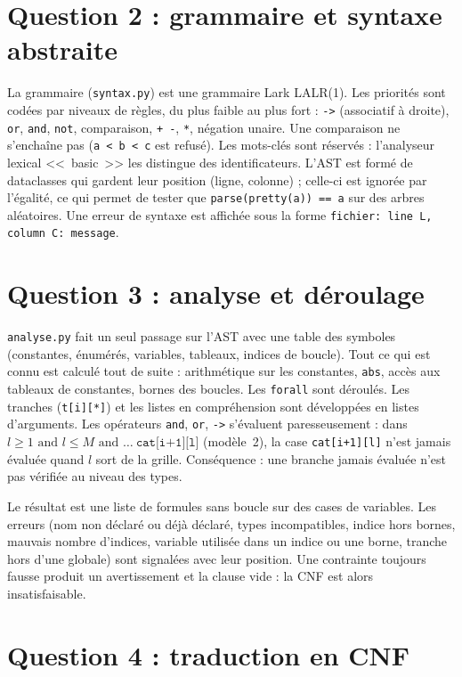 \documentclass[11pt,a4paper]{article}
\newcommand{\f}[1]{\texttt{#1}}
\begin{document}
\section*{Question 2 : grammaire et syntaxe abstraite}

La grammaire (\f{syntax.py}) est une grammaire Lark LALR(1). Les priorités sont codées par niveaux de règles, du plus faible au plus fort : \f{->} (associatif à droite), \f{or}, \f{and}, \f{not}, comparaison, \f{+ -}, \f{*}, négation unaire. Une comparaison ne s'enchaîne pas (\f{a < b < c} est refusé). Les mots-clés sont réservés : l'analyseur lexical <<~basic~>> les distingue des identificateurs. L'AST est formé de dataclasses qui gardent leur position (ligne, colonne) ; celle-ci est ignorée par l'égalité, ce qui permet de tester que \f{parse(pretty(a)) == a} sur des arbres aléatoires. Une erreur de syntaxe est affichée sous la forme \f{fichier: line L, column C: message}.

\section*{Question 3 : analyse et déroulage}

\f{analyse.py} fait un seul passage sur l'AST avec une table des symboles (constantes, énumérés, variables, tableaux, indices de boucle). Tout ce qui est connu est calculé tout de suite : arithmétique sur les constantes, \f{abs}, accès aux tableaux de constantes, bornes des boucles. Les \f{forall} sont déroulés. Les tranches (\f{t[i][*]}) et les listes en compréhension sont développées en listes d'arguments. Les opérateurs \f{and}, \f{or}, \f{->} s'évaluent paresseusement : dans $l\ge 1 \text{ and } l\le M \text{ and } \dots\ \f{cat[i+1][l]}$ (modèle~2), la case \f{cat[i+1][l]} n'est jamais évaluée quand $l$ sort de la grille. Conséquence : une branche jamais évaluée n'est pas vérifiée au niveau des types.

Le résultat est une liste de formules sans boucle sur des cases de variables. Les erreurs (nom non déclaré ou déjà déclaré, types incompatibles, indice hors bornes, mauvais nombre d'indices, variable utilisée dans un indice ou une borne, tranche hors d'une globale) sont signalées avec leur position. Une contrainte toujours fausse produit un avertissement et la clause vide : la CNF est alors insatisfaisable.

\section*{Question 4 : traduction en CNF}
\end{document}
